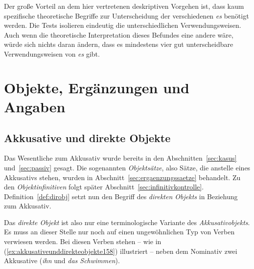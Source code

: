 Der große Vorteil an dem hier vertretenen deskriptiven Vorgehen ist, dass kaum spezifische theoretische Begriffe zur Unterscheidung der verschiedenen \textit{es} benötigt werden.
Die Tests isolieren eindeutig die unterschiedlichen Verwendungsweisen.
Auch wenn die theoretische Interpretation dieses Befundes eine andere wäre, würde sich nichts daran ändern, dass es mindestens vier gut unterscheidbare Verwendungsweisen von \textit{es} gibt.



\section{Objekte, Ergänzungen und Angaben}
\label{sec:objekteergaenzungenundangaben}

\subsection{Akkusative und direkte Objekte}
\label{sec:akkusativeunddirekteobjekte}


Das Wesentliche zum Akkusativ wurde bereits in den Abschnitten~\ref{sec:kasus} und~\ref{sec:passiv} gesagt.
Die sogenannten \textit{Objektsätze}, also Sätze, die anstelle eines Akkusativs stehen, wurden in Abschnitt~\ref{sec:ergaenzungssaetze} behandelt.
Zu den \textit{Objektinfinitiven} folgt später Abschnitt~\ref{sec:infinitivkontrolle}.
Definition~\ref{def:dirobj} setzt nun den Begriff des \textit{direkten Objekts} in Beziehung zum Akkusativ.


Das \textit{direkte Objekt} ist also nur eine terminologische Variante des \textit{Akkusativobjekts}.
Es muss an dieser Stelle nur noch auf einen ungewöhnlichen Typ von Verben verwiesen werden.
Bei diesen Verben stehen -- wie in (\ref{ex:akkusativeunddirekteobjekte158}) illustriert -- neben dem Nominativ zwei Akkusative (\textit{ihn} und \textit{das Schwimmen}).

\begin{exe}
  \ex\label{ex:akkusativeunddirekteobjekte158}
  \begin{xlist}
  \end{xlist}
\end{exe}


